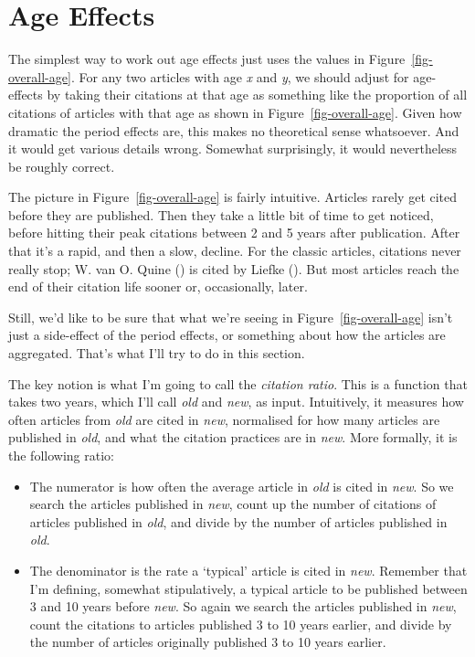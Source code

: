 \documentclass[
  12pt,
  letterpaper,
  DIV=11,
  numbers=noendperiod]{scrartcl}
\providecommand{\tightlist}{%
  \setlength{\itemsep}{0pt}\setlength{\parskip}{0pt}}
\begin{document}
\section{Age Effects}\label{sec-age}

The simplest way to work out age effects just uses the values in
Figure~\ref{fig-overall-age}. For any two articles with age \emph{x} and
\emph{y}, we should adjust for age-effects by taking their citations at
that age as something like the proportion of all citations of articles
with that age as shown in Figure~\ref{fig-overall-age}. Given how
dramatic the period effects are, this makes no theoretical sense
whatsoever. And it would get various details wrong. Somewhat
surprisingly, it would nevertheless be roughly correct.

The picture in Figure~\ref{fig-overall-age} is fairly intuitive.
Articles rarely get cited before they are published. Then they take a
little bit of time to get noticed, before hitting their peak citations
between 2 and 5 years after publication. After that it's a rapid, and
then a slow, decline. For the classic articles, citations never really
stop; W. van O. Quine () is cited
by Liefke (). But most articles
reach the end of their citation life sooner or, occasionally, later.

Still, we'd like to be sure that what we're seeing in
Figure~\ref{fig-overall-age} isn't just a side-effect of the period
effects, or something about how the articles are aggregated. That's what
I'll try to do in this section.

The key notion is what I'm going to call the \emph{citation ratio}. This
is a function that takes two years, which I'll call \emph{old} and
\emph{new}, as input. Intuitively, it measures how often articles from
\emph{old} are cited in \emph{new}, normalised for how many articles are
published in \emph{old}, and what the citation practices are in
\emph{new}. More formally, it is the following ratio:

\begin{itemize}
\tightlist
\item
  The numerator is how often the average article in \emph{old} is cited
  in \emph{new}. So we search the articles published in \emph{new},
  count up the number of citations of articles published in \emph{old},
  and divide by the number of articles published in \emph{old}.
\item
  The denominator is the rate a `typical' article is cited in
  \emph{new}. Remember that I'm defining, somewhat stipulatively, a
  typical article to be published between 3 and 10 years before
  \emph{new}. So again we search the articles published in \emph{new},
  count the citations to articles published 3 to 10 years earlier, and
  divide by the number of articles originally published 3 to 10 years
  earlier.
\end{itemize}
\end{document}
